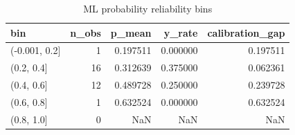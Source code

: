 \begin{table}
\caption{ML probability reliability bins}
\label{tab:7_8}
\begin{tabular}{lrrrr}
\toprule
bin & n_obs & p_mean & y_rate & calibration_gap \\
\midrule
(-0.001, 0.2] & 1 & 0.197511 & 0.000000 & 0.197511 \\
(0.2, 0.4] & 16 & 0.312639 & 0.375000 & 0.062361 \\
(0.4, 0.6] & 12 & 0.489728 & 0.250000 & 0.239728 \\
(0.6, 0.8] & 1 & 0.632524 & 0.000000 & 0.632524 \\
(0.8, 1.0] & 0 & NaN & NaN & NaN \\
\bottomrule
\end{tabular}
\end{table}
